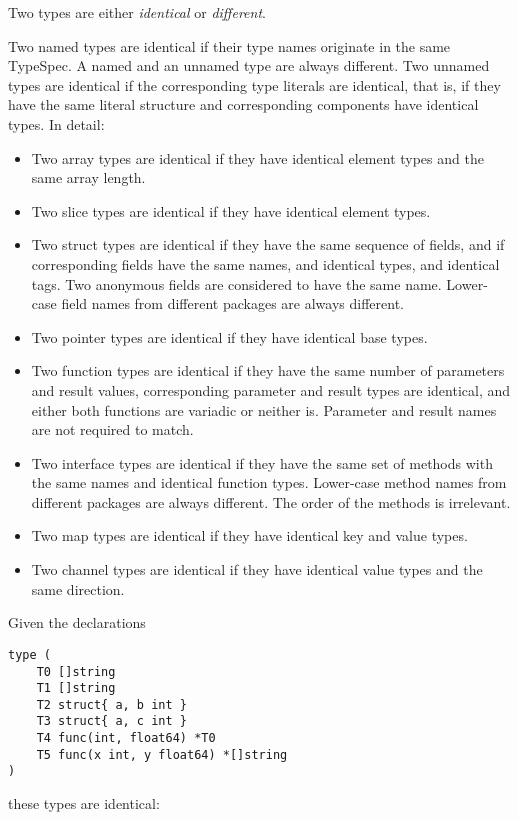 Two types are either \emph{identical} or \emph{different}.

Two named types are identical if their type names originate in the same
TypeSpec. A named and an unnamed type are
always different. Two unnamed types are identical if the corresponding
type literals are identical, that is, if they have the same literal
structure and corresponding components have identical types. In detail:

\begin{itemize}
\item
  Two array types are identical if they have identical element types and
  the same array length.
\item
  Two slice types are identical if they have identical element types.
\item
  Two struct types are identical if they have the same sequence of
  fields, and if corresponding fields have the same names, and identical
  types, and identical tags. Two anonymous fields are considered to have
  the same name. Lower-case field names from different packages are
  always different.
\item
  Two pointer types are identical if they have identical base types.
\item
  Two function types are identical if they have the same number of
  parameters and result values, corresponding parameter and result types
  are identical, and either both functions are variadic or neither is.
  Parameter and result names are not required to match.
\item
  Two interface types are identical if they have the same set of methods
  with the same names and identical function types. Lower-case method
  names from different packages are always different. The order of the
  methods is irrelevant.
\item
  Two map types are identical if they have identical key and value
  types.
\item
  Two channel types are identical if they have identical value types and
  the same direction.
\end{itemize}

Given the declarations

\begin{Verbatim}[frame=single]
type (
    T0 []string
    T1 []string
    T2 struct{ a, b int }
    T3 struct{ a, c int }
    T4 func(int, float64) *T0
    T5 func(x int, y float64) *[]string
)
\end{Verbatim}

these types are identical:

